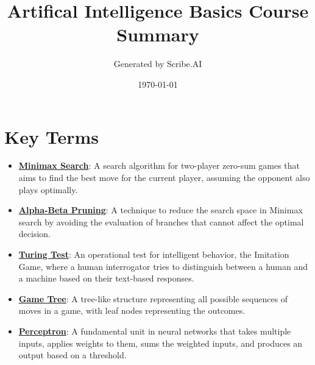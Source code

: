 \documentclass{article}%
\title{Artifical Intelligence Basics Course Summary}%
\author{Generated by Scribe.AI}%
\date{\today}%
\begin{document}
%
\normalsize%
\maketitle%
\section{Key Terms}%
\label{sec:KeyTerms}%
\begin{itemize}[leftmargin=*]%
\item \href{https://purdue.brightspace.com/d2l/common/assets/pdfjs-d2l-dist/1.0.14-legacy/web/viewer.html?file=%2Fcontent%2Fenforced%2F1095467-wl.202510.CS.24300.001%2F02L2-Intro.pdf%3Fou%3D1095467&lang=en-us&container=d2l-fileviewer-rendered-pdf&fullscreen=d2l-fileviewer-rendered-pdf-dialog&height=667#page=22}{\textbf{Minimax Search}}: A search algorithm for two-player zero-sum games that aims to find the best move for the current player, assuming the opponent also plays optimally.%
\item \href{https://purdue.brightspace.com/d2l/common/assets/pdfjs-d2l-dist/1.0.14-legacy/web/viewer.html?file=%2Fcontent%2Fenforced%2F1095467-wl.202510.CS.24300.001%2F02L2-Intro.pdf%3Fou%3D1095467&lang=en-us&container=d2l-fileviewer-rendered-pdf&fullscreen=d2l-fileviewer-rendered-pdf-dialog&height=667#page=23}{\textbf{Alpha{-}Beta Pruning}}: A technique to reduce the search space in Minimax search by avoiding the evaluation of branches that cannot affect the optimal decision.%
\item \href{https://purdue.brightspace.com/d2l/common/assets/pdfjs-d2l-dist/1.0.14-legacy/web/viewer.html?file=%2Fcontent%2Fenforced%2F1095467-wl.202510.CS.24300.001%2F02L2-Intro.pdf%3Fou%3D1095467&lang=en-us&container=d2l-fileviewer-rendered-pdf&fullscreen=d2l-fileviewer-rendered-pdf-dialog&height=667#page=6}{\textbf{Turing Test}}: An operational test for intelligent behavior, the Imitation Game, where a human interrogator tries to distinguish between a human and a machine based on their text-based responses.%
\item \href{https://purdue.brightspace.com/d2l/common/assets/pdfjs-d2l-dist/1.0.14-legacy/web/viewer.html?file=%2Fcontent%2Fenforced%2F1095467-wl.202510.CS.24300.001%2F02L2-Intro.pdf%3Fou%3D1095467&lang=en-us&container=d2l-fileviewer-rendered-pdf&fullscreen=d2l-fileviewer-rendered-pdf-dialog&height=667#page=11}{\textbf{Game Tree}}: A tree-like structure representing all possible sequences of moves in a game, with leaf nodes representing the outcomes.%
\item \href{https://purdue.brightspace.com/d2l/common/assets/pdfjs-d2l-dist/1.0.14-legacy/web/viewer.html?file=%2Fcontent%2Fenforced%2F1095467-wl.202510.CS.24300.001%2F02L2-Intro.pdf%3Fou%3D1095467&lang=en-us&container=d2l-fileviewer-rendered-pdf&fullscreen=d2l-fileviewer-rendered-pdf-dialog&height=667#page=45}{\textbf{Perceptron}}: A fundamental unit in neural networks that takes multiple inputs, applies weights to them, sums the weighted inputs, and produces an output based on a threshold.%

\end{itemize}
\end{document}
